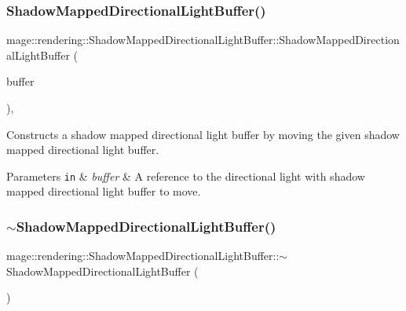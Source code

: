 \subsubsection{\texorpdfstring{Shadow\+Mapped\+Directional\+Light\+Buffer()}{ShadowMappedDirectionalLightBuffer()}\hspace{0.1cm}{\footnotesize\ttfamily [3/3]}}
{\footnotesize\ttfamily mage\+::rendering\+::\+Shadow\+Mapped\+Directional\+Light\+Buffer\+::\+Shadow\+Mapped\+Directional\+Light\+Buffer (\begin{DoxyParamCaption}\item[{\hyperlink{structmage_1_1rendering_1_1_shadow_mapped_directional_light_buffer}{Shadow\+Mapped\+Directional\+Light\+Buffer} \&\&}]{buffer }\end{DoxyParamCaption})\hspace{0.3cm}{\ttfamily [default]}, {\ttfamily [noexcept]}}

Constructs a shadow mapped directional light buffer by moving the given shadow mapped directional light buffer.


\begin{DoxyParams}[1]{Parameters}
\mbox{\tt in}  & {\em buffer} & A reference to the directional light with shadow mapped directional light buffer to move. \\
\hline
\end{DoxyParams}
\hypertarget{structmage_1_1rendering_1_1_shadow_mapped_directional_light_buffer_a5566778f8ff3351b7e37240fe8a3dbf1}{}\label{structmage_1_1rendering_1_1_shadow_mapped_directional_light_buffer_a5566778f8ff3351b7e37240fe8a3dbf1} 
\subsubsection{\texorpdfstring{$\sim$\+Shadow\+Mapped\+Directional\+Light\+Buffer()}{~ShadowMappedDirectionalLightBuffer()}}
{\footnotesize\ttfamily mage\+::rendering\+::\+Shadow\+Mapped\+Directional\+Light\+Buffer\+::$\sim$\+Shadow\+Mapped\+Directional\+Light\+Buffer (\begin{DoxyParamCaption}{ }\end{DoxyParamCaption})\hspace{0.3cm}{\ttfamily [default]}}

